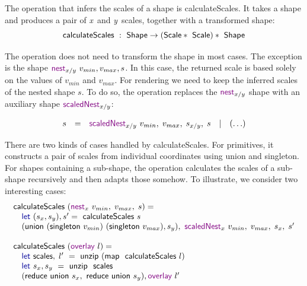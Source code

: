 \documentclass{jfp}
\newcommand{\X}{\emph{x}\ }
\newcommand{\Y}{\emph{y}\ }
\newcommand{\ident}[1]{\textnormal{\textcolor{idclr}{\sffamily #1}}}
\newcommand{\kvd}[1]{\textnormal{\textcolor{kvdclr}{\sffamily #1}}}
\newcommand{\fkvd}[1]{\textnormal{\textcolor{fkvdclr}{\sffamily #1}}}
\begin{document}
The operation that infers the scales of a shape is \ident{calculateScales}. It takes a shape
and produces a pair of \X and \Y scales, together with a transformed shape:
%
\begin{equation*}
  \ident{calculateScales} ~:~ \ident{Shape} \rightarrow (\ident{Scale}*\ident{Scale}) * \ident{Shape}
\end{equation*}

\vspace{-1.25em}
\noindent
The operation does not need to transform the shape in most cases. The exception is the
shape $\kvd{nest}_{x/y}~v_{min}, v_{max}, s$. In this case, the returned scale is based solely on the
values of $v_{min}$ and $v_{max}$. For rendering we need to keep the inferred scales of the nested
shape $s$. To do so, the operation replaces the $\kvd{nest}_{x/y}$ shape with an auxiliary shape
$\kvd{scaledNest}_{x/y}$:

\begin{equation*}
\begin{array}{rclcl}
s &=& \kvd{scaledNest}_{x/y}~v_{min},\;v_{max},\;s_{x/y},\;s &|& (\ldots)
\end{array}
\end{equation*}

\vspace{-1em}
\noindent
There are two kinds of cases handled by \ident{calculateScales}. For primitives, it constructs
a pair of scales from individual coordinates using \ident{union} and \ident{singleton}. For
shapes containing a sub-shape, the operation calculates the scales of a sub-shape recursively
and then adapts those somehow. To illustrate, we consider two interesting cases:
%
\begin{equation*}
\begin{array}{l}
\ident{calculateScales}~(\kvd{nest}_x~v_{min},\;v_{max},\;s) = \\
\quad\fkvd{let}~(s_x, s_y),s' = \ident{calculateScales}~s\\
\quad(\ident{union}~(\ident{singleton}~v_{min})~(\ident{singleton}~v_{max}), s_y),~\kvd{scaledNest}_x~v_{min},\;v_{max},\;s_x,\;s'\\
\\
\ident{calculateScales}~(\kvd{overlay}~l) = \\
\quad\fkvd{let}~\ident{scales},\;l'~=~\ident{unzip}~(\ident{map}~\ident{calculateScales}~l)\\
\quad\fkvd{let}~s_x,s_y~=~\ident{unzip}~\ident{scales}\\
\quad(\ident{reduce}~\ident{union}~s_x,~\ident{reduce}~\ident{union}~s_y), \kvd{overlay}~l'
\end{array}
\end{equation*}
\end{document}
